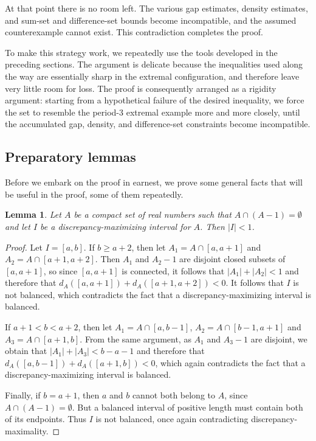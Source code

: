 \documentclass[11pt,reqno]{amsart}
\newtheorem{lem}[thm]{Lemma}
\theoremstyle{definition}
\begin{document}
At that point there is no room left. The various gap estimates, density estimates, and sum-set and difference-set bounds become incompatible, and the assumed counterexample cannot exist. This contradiction completes the proof.

To make this strategy work, we repeatedly use the tools developed in the preceding sections. The argument is delicate because the inequalities used along the way are essentially sharp in the extremal configuration, and therefore leave very little room for loss. The proof is consequently arranged as a rigidity argument: starting from a hypothetical failure of the desired inequality, we force the set to resemble the period-3 extremal example more and more closely, until the accumulated gap, density, and difference-set constraints become incompatible.





\subsection{Preparatory lemmas}

Before we embark on the proof in earnest, we prove some general facts that will be useful in the proof, some of them repeatedly.

\begin{lem} \label{s<1} Let $A$ be a compact set of real numbers such that $A\cap(A-1)=\emptyset$ and let $I$ be a discrepancy-maximizing interval for $A$. Then $|I|<1$.
\end{lem}

\begin{proof}
Let $I=[a,b]$. If $b\geq a+2$, then let $A_1=A\cap[a,a+1]$ and $A_2=A\cap[a+1,a+2]$. Then $A_1$ and $A_2-1$ are disjoint closed subsets of $[a,a+1]$, so since $[a,a+1]$ is connected, it follows that $|A_1|+|A_2|<1$ and therefore that $d_A([a,a+1])+d_A([a+1,a+2])<0$. It follows that $I$ is not balanced, which contradicts the fact that a discrepancy-maximizing interval is balanced.

If $a+1< b<a+2$, then let $A_1=A\cap[a,b-1]$, $A_2=A\cap[b-1,a+1]$ and $A_3=A\cap[a+1,b]$. From the same argument, as $A_1$ and $A_3-1$ are disjoint, we obtain that $|A_1|+|A_3|<b-a-1$ and therefore that $d_A([a,b-1])+d_A([a+1,b])<0$, which again contradicts the fact that a discrepancy-maximizing interval is balanced. 

Finally, if $b=a+1$, then $a$ and $b$ cannot both belong to $A$, since
$A\cap(A-1)=\emptyset$. But a balanced interval of positive length must contain both of its endpoints. Thus $I$ is not balanced, once again contradicting discrepancy-maximality.
\end{proof}
\end{document}
